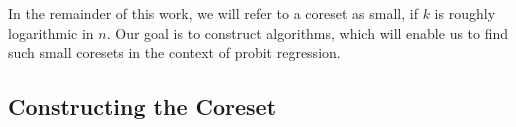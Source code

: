 In the remainder of this work, we will refer to a coreset as
small, if $k$ is roughly logarithmic in $n$.
Our goal is to construct algorithms, which will enable us to
find such small coresets in the context of probit regression.





\subsection{Constructing the Coreset}







